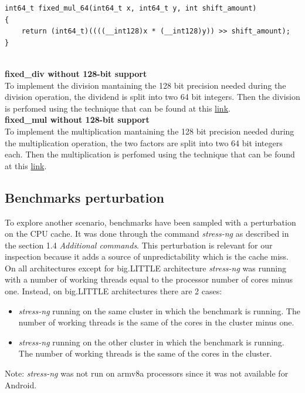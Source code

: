 \begin{lstlisting}
int64_t fixed_mul_64(int64_t x, int64_t y, int shift_amount)
{
	return (int64_t)((((__int128)x * (__int128)y)) >> shift_amount);
}
\end{lstlisting}
\clearpage
\textbf{\\fixed\_div without 128-bit support}\\[0.2cm]
To implement the division mantaining the 128 bit precision needed during the division operation,  the dividend is split into two 64 bit integers. Then the division is perfomed using the technique that can be found at this \href{https://codereview.stackexchange.com/questions/67962/mostly-portable-128-by-64-bit-division}{link}.\\[0.2cm]
\textbf{fixed\_mul without 128-bit support}\\[0.2cm]
To implement the multiplication mantaining the 128 bit precision needed during the multiplication operation,  the two factors are split into two 64 bit integers each. Then the multiplication is perfomed using the technique that can be found at this \href{https://stackoverflow.com/questions/31652875/fastest-way-to-multiply-two-64-bit-ints-to-128-bit-then-to-64-bit}{link}.

\subsection{Benchmarks perturbation}
To explore another scenario, benchmarks have been sampled with a perturbation on the CPU cache. It was done through the command \textit{stress-ng} as described in the section 1.4 \textit{Additional commands}.\newline
This perturbation is relevant for our inspection because it adds a source of unpredictability which is the cache miss.\newline
On all architectures except for big.LITTLE architecture \textit{stress-ng} was running with a number of working threads equal to the processor number of cores minus one. Instead, on big.LITTLE architectures there are 2 cases:
\begin{itemize}
	\item \textit{stress-ng} running on the same cluster in which the benchmark is running. The number of working threads is the same of the cores in the cluster minus one.
	\item  \textit{stress-ng} running on the other cluster in which the benchmark is running. The number of working threads is the same of the cores in the cluster.
\end{itemize}
Note: \textit{stress-ng} was not run on armv8a processors since it was not available for Android.
\clearpage
